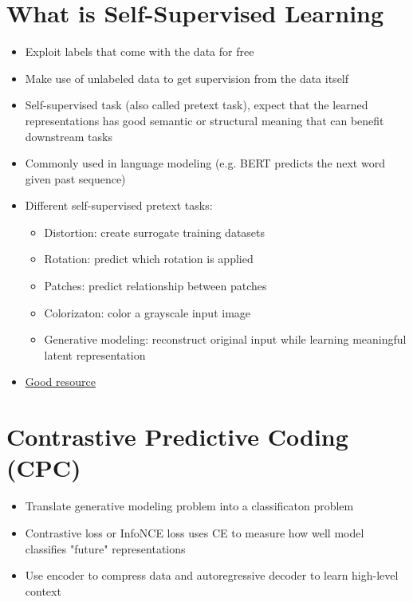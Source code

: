 \documentclass[../main.tex]{subfiles}
\begin{document}
\section{What is Self-Supervised Learning}
  \begin{itemize}
    \item Exploit labels that come with the data for free
    \item Make use of unlabeled data to get supervision from the data itself
    \item Self-supervised task (also called pretext task), expect that the learned representations has good semantic or structural meaning that can benefit downstream tasks
    \item Commonly used in language modeling (e.g. BERT predicts the next word given past sequence)
    \item Different self-supervised pretext tasks:
      \begin{itemize}
        \item Distortion: create surrogate training datasets
        \item Rotation: predict which rotation is applied
        \item Patches: predict relationship between patches
        \item Colorizaton: color a grayscale input image
        \item Generative modeling: reconstruct original input while learning meaningful latent representation
      \end{itemize}
    \item \href{https://lilianweng.github.io/lil-log/2019/11/10/self-supervised-learning.html}{Good resource}
  \end{itemize}

\section{Contrastive Predictive Coding (CPC)}
  \begin{itemize}
    \item Translate generative modeling problem into a classificaton problem
    \item Contrastive loss or InfoNCE loss uses CE to measure how well model classifies "future" representations
    \item Use encoder to compress data and autoregressive decoder to learn high-level context
  \end{itemize}
\end{document}
